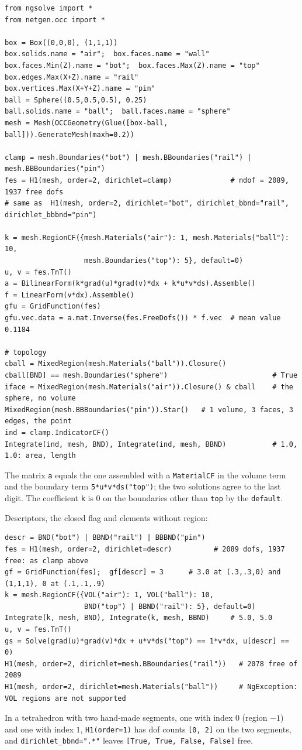 \documentclass[10pt,a4paper]{article}
\newcommand{\code}[1]{\texttt{#1}}
\begin{document}
\begin{lstlisting}
from ngsolve import *
from netgen.occ import *

box = Box((0,0,0), (1,1,1))
box.solids.name = "air";  box.faces.name = "wall"
box.faces.Min(Z).name = "bot";  box.faces.Max(Z).name = "top"
box.edges.Max(X+Z).name = "rail"
box.vertices.Max(X+Y+Z).name = "pin"
ball = Sphere((0.5,0.5,0.5), 0.25)
ball.solids.name = "ball";  ball.faces.name = "sphere"
mesh = Mesh(OCCGeometry(Glue([box-ball, ball])).GenerateMesh(maxh=0.2))

clamp = mesh.Boundaries("bot") | mesh.BBoundaries("rail") | mesh.BBBoundaries("pin")
fes = H1(mesh, order=2, dirichlet=clamp)              # ndof = 2089, 1937 free dofs
# same as  H1(mesh, order=2, dirichlet="bot", dirichlet_bbnd="rail", dirichlet_bbbnd="pin")

k = mesh.RegionCF({mesh.Materials("air"): 1, mesh.Materials("ball"): 10,
                   mesh.Boundaries("top"): 5}, default=0)
u, v = fes.TnT()
a = BilinearForm(k*grad(u)*grad(v)*dx + k*u*v*ds).Assemble()
f = LinearForm(v*dx).Assemble()
gfu = GridFunction(fes)
gfu.vec.data = a.mat.Inverse(fes.FreeDofs()) * f.vec  # mean value 0.1184

# topology
cball = MixedRegion(mesh.Materials("ball")).Closure()
cball[BND] == mesh.Boundaries("sphere")                         # True
iface = MixedRegion(mesh.Materials("air")).Closure() & cball    # the sphere, no volume
MixedRegion(mesh.BBBoundaries("pin")).Star()   # 1 volume, 3 faces, 3 edges, the point
ind = clamp.IndicatorCF()
Integrate(ind, mesh, BND), Integrate(ind, mesh, BBND)           # 1.0, 1.0: area, length
\end{lstlisting}
The matrix \code{a} equals the one assembled with a \code{MaterialCF} in the volume term and the boundary term \code{5*u*v*ds("top")}; the two solutions agree to the last digit. The coefficient \code{k} is $0$ on the boundaries other than \code{top} by the \code{default}.

Descriptors, the closed flag and elements without region:
\begin{lstlisting}
descr = BND("bot") | BBND("rail") | BBBND("pin")
fes = H1(mesh, order=2, dirichlet=descr)          # 2089 dofs, 1937 free: as clamp above
gf = GridFunction(fes);  gf[descr] = 3      # 3.0 at (.3,.3,0) and (1,1,1), 0 at (.1,.1,.9)
k = mesh.RegionCF({VOL("air"): 1, VOL("ball"): 10,
                   BND("top") | BBND("rail"): 5}, default=0)
Integrate(k, mesh, BND), Integrate(k, mesh, BBND)     # 5.0, 5.0
u, v = fes.TnT()
gs = Solve(grad(u)*grad(v)*dx + u*v*ds("top") == 1*v*dx, u[descr] == 0)
H1(mesh, order=2, dirichlet=mesh.BBoundaries("rail"))   # 2078 free of 2089
H1(mesh, order=2, dirichlet=mesh.Materials("ball"))     # NgException: VOL regions are not supported
\end{lstlisting}
In a tetrahedron with two hand-made segments, one with index $0$ (region $-1$) and one with index $1$, \code{H1(order=1)} has dof counts \code{[0, 2]} on the two segments, and \code{dirichlet\_bbnd=".*"} leaves \code{[True, True, False, False]} free.
\end{document}
